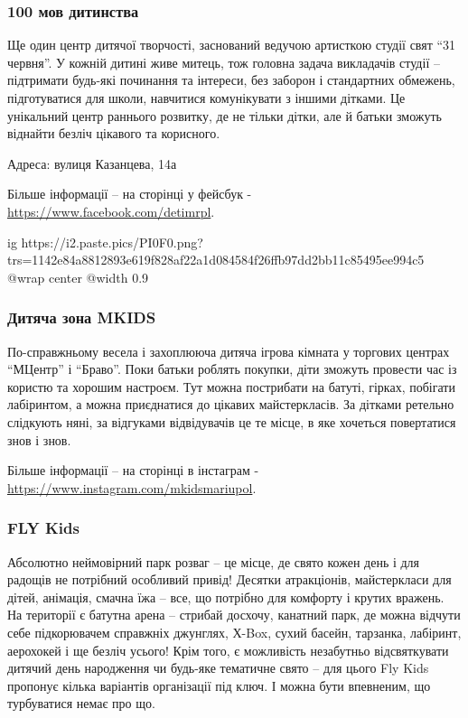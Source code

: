 \subsubsection{100 мов дитинства}

Ще один центр дитячої творчості, заснований ведучою артисткою студії свят \enquote{31
червня}. У кожній дитині живе митець, тож головна задача викладачів студії –
підтримати будь-які починання та інтереси, без заборон і стандартних обмежень,
підготуватися для школи, навчитися комунікувати з іншими дітками. Це унікальний
центр раннього розвитку, де не тільки дітки, але й батьки зможуть віднайти
безліч цікавого та корисного.

Адреса: вулиця Казанцева, 14а

Більше інформації – на сторінці у фейсбук - \url{https://www.facebook.com/detimrpl}.

\ifcmt
  ig https://i2.paste.pics/PI0F0.png?trs=1142e84a8812893e619f828af22a1d084584f26ffb97dd2bb11c85495ee994c5
  @wrap center
  @width 0.9
\fi


\subsubsection{Дитяча зона MKIDS}

По-справжньому весела і захоплююча дитяча ігрова кімната у торгових центрах
\enquote{МЦентр} і \enquote{Браво}. Поки батьки роблять покупки, діти зможуть провести час із
користю та хорошим настроєм. Тут можна пострибати на батуті, гірках, побігати
лабіринтом, а можна приєднатися до цікавих майстеркласів. За дітками ретельно
слідкують няні, за відгуками відвідувачів це те місце, в яке хочеться
повертатися знов і знов.

Більше інформації – на сторінці в інстаграм - \url{https://www.instagram.com/mkidsmariupol}.


\subsubsection{FLY Kids}

Абсолютно неймовірний парк розваг – це місце, де свято кожен день і для радощів
не потрібний особливий привід! Десятки атракціонів, майстеркласи для дітей,
анімація, смачна їжа – все, що потрібно для комфорту і крутих вражень. На
території є батутна арена – стрибай досхочу, канатний парк, де можна відчути
себе підкорювачем справжніх джунглях, Х-Box, сухий басейн, тарзанка, лабіринт,
аерохокей і ще безліч усього! Крім того, є можливість незабутньо відсвяткувати
дитячий день народження чи будь-яке тематичне свято – для цього Fly Kids
пропонує кілька варіантів організації під ключ. І можна бути впевненим, що
турбуватися немає про що.


